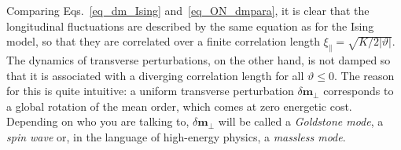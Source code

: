 Comparing Eqs.~\eqref{eq_dm_Ising} and~\eqref{eq_ON_dmpara},
it is clear that the longitudinal fluctuations are described by the same equation as for the Ising model, so that they are correlated over a finite correlation length $\xi_\| = \sqrt{ K / 2 |\vartheta| }$.
The dynamics of transverse perturbations, on the other hand, is not damped so that it is
associated with a diverging correlation length for all $\vartheta \le 0$.
The reason for this is quite intuitive: a uniform transverse perturbation $\delta\bm m_\perp$ corresponds to a global rotation of the mean order, which comes at zero energetic cost. 
Depending on who you are talking to, $\delta \bm m_\perp$ will be called a \emph{Goldstone mode}, a \emph{spin wave} or,
in the language of high-energy physics, a \emph{massless mode}.


